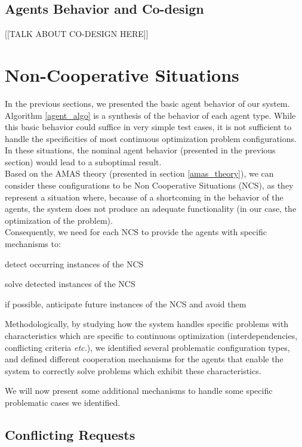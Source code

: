 \subsection{Agents Behavior and Co-design}

[[TALK ABOUT CO-DESIGN HERE]]

\section{Non-Cooperative Situations}\label{NCS_pres}

In the previous sections, we presented the basic agent behavior of our system. Algorithm \ref{agent_algo} is a synthesis of the behavior of each agent type. While this basic behavior could suffice in very simple test cases, it is not sufficient to handle the specificities of most continuous optimization problem configurations. In these situations, the nominal agent behavior (presented in the previous section) would lead to a suboptimal result.\\
Based on the AMAS theory (presented in section \ref{amas_theory}), we can consider these configurations to be Non Cooperative Situations (NCS), as they represent a situation where, because of a shortcoming in the behavior of the agents, the system does not produce an adequate functionality (in our case, the optimization of the problem).\\
Consequently, we need for each NCS to provide the agents with specific mechanisms to:
\begin{compactenum}
\item detect occurring instances of the NCS
\item solve detected instances of the NCS
\item if possible, anticipate future instances of the NCS and avoid them
\end{compactenum}

Methodologically, by studying how the system handles specific problems with characteristics which are specific to continuous optimization (interdependencies, conflicting criteria \emph{etc.}), we identified several problematic configuration types, and defined different cooperation mechanisms for the agents that enable the system to correctly solve problems which exhibit these characteristics.

We will now present some additional mechanisms to handle some specific problematic cases we identified.

\subsection{Conflicting Requests}


